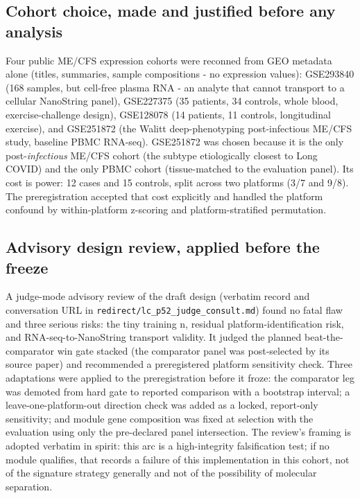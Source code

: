 \documentclass[11pt,a4paper]{article}
\begin{document}
\subsection{Cohort choice, made and justified before any analysis}
Four public ME/CFS expression cohorts were reconned from GEO metadata alone
(titles, summaries, sample compositions - no expression values): GSE293840
(168 samples, but cell-free plasma RNA - an analyte that cannot transport to a
cellular NanoString panel), GSE227375 (35 patients, 34 controls, whole blood,
exercise-challenge design), GSE128078 (14 patients, 11 controls, longitudinal
exercise), and GSE251872 (the Walitt deep-phenotyping post-infectious ME/CFS
study, baseline PBMC RNA-seq). GSE251872 was chosen because it is the only
post-\emph{infectious} ME/CFS cohort (the subtype etiologically closest to
Long COVID) and the only PBMC cohort (tissue-matched to the evaluation panel).
Its cost is power: 12 cases and 15 controls, split across two platforms
(3/7 and 9/8). The preregistration accepted that cost explicitly and handled
the platform confound by within-platform z-scoring and platform-stratified
permutation.

\subsection{Advisory design review, applied before the freeze}
A judge-mode advisory review of the draft design (verbatim record and
conversation URL in \texttt{redirect/lc\_p52\_judge\_consult.md}) found no
fatal flaw and three serious risks: the tiny training n, residual
platform-identification risk, and RNA-seq-to-NanoString transport validity. It
judged the planned beat-the-comparator win gate stacked (the comparator panel
was post-selected by its source paper) and recommended a preregistered
platform sensitivity check. Three adaptations were applied to the
preregistration before it froze: the comparator leg was demoted from hard gate
to reported comparison with a bootstrap interval; a leave-one-platform-out
direction check was added as a locked, report-only sensitivity; and module gene
composition was fixed at selection with the evaluation using only the
pre-declared panel intersection. The review's framing is adopted verbatim in
spirit: this arc is a high-integrity falsification test; if no module qualifies, that records a failure of this implementation in
this cohort, not of the signature strategy generally and not of the
possibility of molecular separation.
\end{document}

